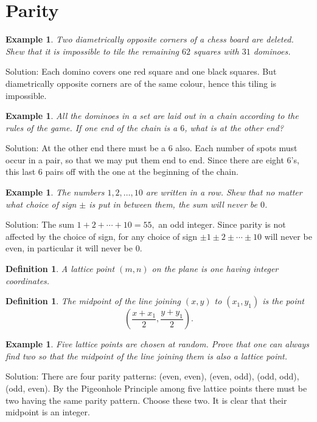 \documentclass[11pt, openany]{book}
\theoremstyle{change} \theoremheaderfont{\blue\sffamily\bfseries}
\newtheorem{exa}[thm]{Example}
\newtheorem{df}[thm]{Definition}
\theoremstyle{nonumberplain} \theoremheaderfont{\sffamily\bfseries}
\newcommand{\í}{\'{\i}}
\begin{document}
\section{Parity}
\begin{exa}
Two diametrically opposite corners of a chess board are deleted.
Shew that it is impossible to tile the remaining $62$ squares with
$31$ dominoes.
\end{exa}
Solution: Each domino covers one red square and one black squares.
But diametrically opposite corners are of the same colour, hence
this tiling is impossible.

\begin{exa} All the dominoes in a set are laid out in a chain according
to the rules of the game. If one end of the chain is a $6$, what
is at the other end?
\end{exa}
Solution: At the other end there must be a 6 also. Each number of
spots must occur in a pair, so that we may put them end to end.
Since there are eight 6's, this last 6 pairs off with the one at
the beginning of the chain.

\begin{exa}
The numbers $1, 2, \ldots , 10$ are written in a row. Shew that no
matter what choice of sign $\pm$ is put in between them, the sum
will never be $0$.
\end{exa}
Solution: The sum $1 + 2 + \cdots + 10 = 55,$ an odd integer.
Since parity is not affected by the choice of sign, for any choice
of sign $\pm 1 \pm 2 \pm \cdots \pm 10$ will never be even, in
particular it will never be 0.


\begin{df}
A {\em lattice point} $(m, n)$ on the plane is one having integer
coordinates.
\end{df}
\begin{df}
The midpoint of the line joining $(x, y)$ to $(x_1, y_1)$ is the
point
$$\left(\frac{x + x_1}{2}, \frac{y + y_1}{2}\right) .$$
\end{df}


\begin{exa}
Five lattice points are chosen at random. Prove that one can
always find two so that the midpoint of the line joining them is
also a lattice point.
\end{exa}
Solution: There are four parity patterns: (even, even), (even,
odd), (odd, odd), (odd, even). By the Pigeonhole Principle among
five lattice points there must be two having the same parity
pattern. Choose these two. It is clear that their midpoint is an
integer.
\end{document}
